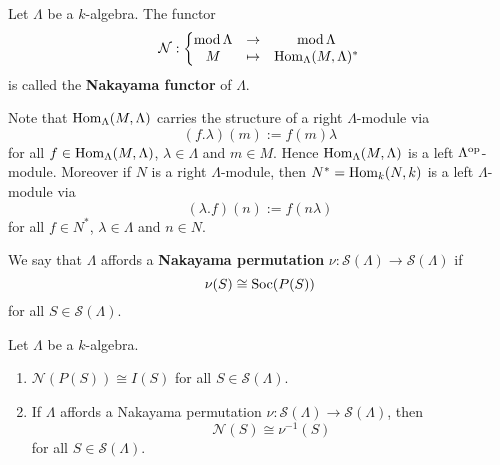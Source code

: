 
\begin{definition}
Let $\Lambda$ be a $k$-algebra. The functor
\[
\mathcal N:
\left\{ \begin{matrix} \operatorname{mod}\Lambda & \to & \operatorname{mod}\Lambda \\ M & \mapsto & \operatorname{Hom}_\Lambda(M,\Lambda)^* \end{matrix} \right.
\]
is called the \textbf{Nakayama functor} of $\Lambda$.
\end{definition}


\begin{remark}
Note that $\operatorname{Hom}_\Lambda(M,\Lambda)$ carries the structure of a right $\Lambda$-module via
\[
(f.\lambda)(m):=f(m)\lambda
\]
for all $f\in \operatorname{Hom}_\Lambda(M,\Lambda)$, $\lambda\in\Lambda$ and $m\in M$. Hence $\operatorname{Hom}_\Lambda(M,\Lambda)$ is a left $\Lambda^{\mathrm{op}}$-module. Moreover if $N$ is a right $\Lambda$-module, then $N^*=\operatorname{Hom}_k(N,k)$ is a left $\Lambda$-module via
\[
(\lambda.f)(n):=f(n\lambda)
\]
for all $f\in N^*$, $\lambda\in\Lambda$ and $n\in N$. 
\end{remark}


\begin{definition}
We say that $\Lambda$ affords a \textbf{Nakayama permutation} $\nu:\mathcal S(\Lambda)\to\mathcal S(\Lambda)$ if
\[
\nu(S)\cong\operatorname{Soc}(P(S))
\]
for all $S\in \mathcal S(\Lambda)$.
\end{definition}


\begin{lemma}\label{1.5.4}
Let $\Lambda$ be a $k$-algebra.
\begin{enumerate}
\item $\mathcal N(P(S))\cong I(S)$ for all $S\in\mathcal S(\Lambda)$.
\item If $\Lambda$ affords a Nakayama permutation $\nu:\mathcal S(\Lambda)\to \mathcal S(\Lambda)$, then
\[
\mathcal N(S)\cong \nu^{-1}(S)
\]
for all $S\in\mathcal S(\Lambda)$.
\end{enumerate}
\end{lemma}


